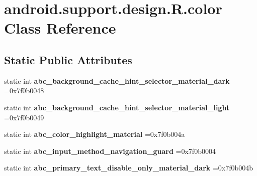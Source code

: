 \hypertarget{classandroid_1_1support_1_1design_1_1R_1_1color}{}\section{android.\+support.\+design.\+R.\+color Class Reference}
\label{classandroid_1_1support_1_1design_1_1R_1_1color}
\subsection*{Static Public Attributes}
\begin{DoxyCompactItemize}
\item 
\mbox{\label{classandroid_1_1support_1_1design_1_1R_1_1color_a61c1825e4de82dbd013a86f9998b890f}} 
static int {\bfseries abc\+\_\+background\+\_\+cache\+\_\+hint\+\_\+selector\+\_\+material\+\_\+dark} =0x7f0b0048
\item 
\mbox{\label{classandroid_1_1support_1_1design_1_1R_1_1color_a4d9b931e84bae82902462af9c2e1d141}} 
static int {\bfseries abc\+\_\+background\+\_\+cache\+\_\+hint\+\_\+selector\+\_\+material\+\_\+light} =0x7f0b0049
\item 
\mbox{\label{classandroid_1_1support_1_1design_1_1R_1_1color_a155d4a38c8121376b8ecc574d39444fc}} 
static int {\bfseries abc\+\_\+color\+\_\+highlight\+\_\+material} =0x7f0b004a
\item 
\mbox{\label{classandroid_1_1support_1_1design_1_1R_1_1color_af58a934c66b4e4bb873016c5cbe633d1}} 
static int {\bfseries abc\+\_\+input\+\_\+method\+\_\+navigation\+\_\+guard} =0x7f0b0004
\item 
\mbox{\label{classandroid_1_1support_1_1design_1_1R_1_1color_acbe91f575fedc4951220601a399d7d75}} 
static int {\bfseries abc\+\_\+primary\+\_\+text\+\_\+disable\+\_\+only\+\_\+material\+\_\+dark} =0x7f0b004b
\item 
\mbox{\label{classandroid_1_1support_1_1design_1_1R_1_1color_af79e15ff92b8285e1ba08a95c6c29e44}} 

\end{DoxyCompactItemize}
